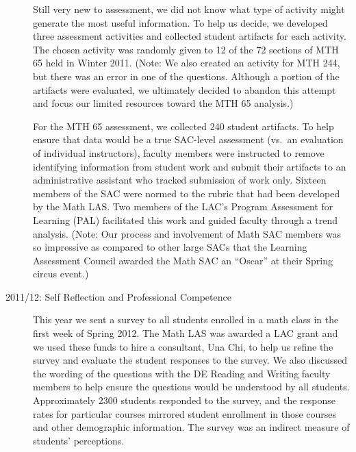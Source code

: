 \begin{description}
Still very new to assessment, we did not know what type of activity might
generate the most useful information.  To help us decide, we developed three
assessment activities and collected student artifacts for each activity.  The
chosen activity was randomly given to 12 of the 72 sections of MTH 65 held in
Winter 2011.  (Note: We also created an activity for MTH 244, but there was an
error in one of the questions.  Although a portion of the artifacts were
evaluated, we ultimately decided to abandon this attempt and focus our limited
resources toward the MTH 65 analysis.)

For the MTH 65 assessment, we collected 240 student artifacts.  To help ensure
that data would be a true SAC-level assessment (vs.\ an evaluation of individual
instructors), faculty members were instructed to remove identifying information
from student work and submit their artifacts to an administrative assistant who
tracked submission of work only.  Sixteen members of the SAC were normed to the
rubric that had been developed by the Math LAS.  Two members of the LAC's
Program Assessment for Learning (PAL) facilitated this work and guided faculty
through a trend analysis.  (Note: Our process and involvement of Math SAC
members was so impressive as compared to other large SACs that the Learning
Assessment Council awarded the Math SAC an ``Oscar'' at their Spring circus
event.)

\item[2011/12: Self Reflection and Professional Competence]

This year we sent a survey to all students enrolled in a math class in the first
week of Spring 2012.  The Math LAS was awarded a LAC grant and we used these
funds to hire a consultant, Una Chi, to help us refine the survey and evaluate
the student responses to the survey.  We also discussed the wording of the
questions with the DE Reading and Writing faculty members to help ensure the
questions would be understood by all students. Approximately 2300 students
responded to the survey, and the response rates for particular courses mirrored
student enrollment in those courses and other demographic information.  The
survey was an indirect measure of students' perceptions.  


\end{description}
